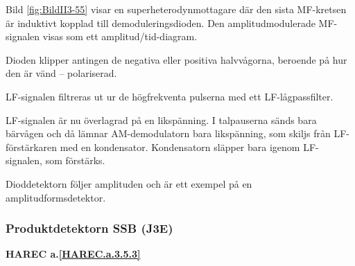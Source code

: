 Bild \ref{fig:BildII3-55} visar en superheterodynmottagare där den sista
MF-kretsen är induktivt kopplad till demoduleringsdioden.
Den amplitudmodulerade MF-signalen visas som ett amplitud/tid-diagram.

Dioden klipper antingen de negativa eller positiva halvvågorna,
beroende på hur den är vänd -- polariserad.

LF-signalen filtreras ut ur de högfrekventa pulserna med ett LF-lågpassfilter.

LF-signalen är nu överlagrad på en likspänning.
I talpauserna sänds bara bärvågen och då lämnar AM-demodulatorn bara
likspänning, som skiljs från LF-förstärkaren med en kondensator.
Kondensatorn släpper bara igenom LF-signalen, som förstärks.

Dioddetektorn följer amplituden och är ett exempel på en amplitudformsdetektor.

\subsubsection{Produktdetektorn SSB (J3E)}
\textbf{HAREC a.\ref{HAREC.a.3.5.3}\label{myHAREC.a.3.5.3}}

